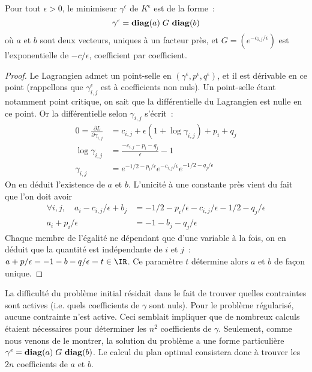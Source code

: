 \begin{lemma}
Pour tout $\epsilon > 0$, le minimiseur $\gamma^\epsilon$ de $K^\epsilon$ est de la forme~:
\begin{equation}\label{eq:aGb}
\gamma^\epsilon = \operatorname{\mathbf{diag}}(a)\;G\,\operatorname{\mathbf{diag}}(b)
\end{equation}
où $a$ et $b$ sont deux vecteurs, uniques à un facteur près, et $G = (e^{-c_{i,j}/\epsilon})$ est l'exponentielle de $-c/\epsilon$, coefficient par coefficient.
\end{lemma}
\begin{proof}
Le Lagrangien admet un point-selle en $(\gamma^\epsilon,p^\epsilon,q^\epsilon)$, et il est dérivable en ce point (rappellons que $\gamma^\epsilon_{i,j}$ est à coefficients non nuls). Un point-selle étant notamment point critique, on sait que la différentielle du Lagrangien est nulle en ce point. Or la différentielle selon $\gamma_{i,j}$ s'écrit~:
\[\begin{split}
0 = \frac{\partial L}{\partial \gamma_{i,j}}
&= c_{i,j} + \epsilon(1+\log \gamma_{i,j} ) + p_i + q_j \\
\log \gamma_{i,j} &= \frac{-c_{i,j} - p_i - q_j}{\epsilon} -1\\
\gamma_{i,j} &= e^{-1/2 - p_i / \epsilon} e^{-c_{i,j}/\epsilon} e^{-1/2 - q_j / \epsilon}
\end{split}\]
On en déduit l'existence de $a$ et $b$. L'unicité à une constante près vient du fait que l'on doit avoir \[\begin{split}
\forall i,j,\quad
a_i - c_{i,j}/\epsilon + b_j &= -1/2 - p_i/\epsilon - c_{i,j} / \epsilon - 1/2 - q_j/ \epsilon \\
a_i + p_i/\epsilon &= -1 - b_j - q_j/\epsilon
 \end{split}\]
Chaque membre de l'égalité ne dépendant que d'une variable à la fois, on en déduit que la quantité est indépendante de $i$ et $j$~: $a + p/\epsilon = -1-b-q/\epsilon = t \in \IR$. Ce paramètre $t$ détermine alors $a$ et $b$ de façon unique.
\end{proof}

La difficulté du problème initial résidait dans le fait de trouver quelles contraintes sont actives (i.e. quels coefficients de $\gamma$ sont nuls). Pour le problème régularisé, aucune contrainte n'est active. Ceci semblait impliquer que de nombreux calculs étaient nécessaires pour déterminer les $n^2$ coefficients de $\gamma$. Seulement, comme nous venons de le montrer, la solution du problème a une forme particulière $\gamma^\epsilon = \operatorname{\mathbf{diag}}(a)\;G\,\operatorname{\mathbf{diag}}(b)$. Le calcul du plan optimal consistera donc à trouver les $2n$ coefficients de $a$ et $b$.

